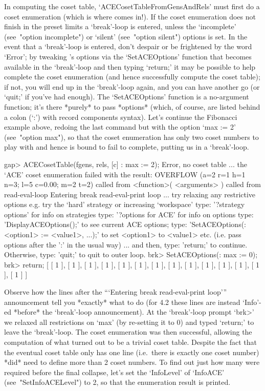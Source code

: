In computing  the  coset  table,  `ACECosetTableFromGensAndRels'  must
first do a coset enumeration (which is where {\ACE} comes in!). If the
coset enumeration does not finish in the preset limits a  `break'-loop
is entered,  unless  the  `incomplete'  (see~"option  incomplete")  or
`silent' (see~"option silent") options is set. In  the  event  that  a
`break'-loop is entered, don't despair or be frightened  by  the  word
`Error'; by tweaking {\ACE}'s options via the `SetACEOptions' function
that becomes available in the `break'-loop and then  typing  `return;'
it may be possible to help {\ACE} complete the coset enumeration  (and
hence successfully compute the coset table); if not, you will  end  up
in the `break'-loop again, and you can have another go (or `quit;'  if
you've had enough). The  `SetACEOptions'  function  is  a  no-argument
function; it's there *purely* to pass *options* (which, of course, are
listed behind a colon (`:')  with  record  components  syntax).  Let's
continue the Fibonacci example above, redoing  the  last  command  but
with the option `max := 2'  (see~"option  max"),  so  that  the  coset
enumeration has only two coset numbers to play with and hence is bound
to fail to complete, putting us in a `break'-loop.

\beginexample
gap> ACECosetTable(fgens, rels, [c] : max := 2);
Error, no coset table ...
 the `ACE' coset enumeration failed with the result:
 OVERFLOW (a=2 r=1 h=1 n=3; l=5 c=0.00; m=2 t=2)
 called from
<function>( <arguments> ) called from read-eval-loop
Entering break read-eval-print loop ...
 try relaxing any restrictive options
 e.g. try the `hard' strategy or increasing `workspace'
 type: '?strategy options' for info on strategies
 type: '?options for ACE' for info on options
 type: 'DisplayACEOptions();' to see current ACE options;
 type: 'SetACEOptions(:<option1> := <value1>, ...);'
 to set <option1> to <value1> etc.
 (i.e. pass options after the ':' in the usual way)
 ... and then, type: 'return;' to continue.
 Otherwise, type: 'quit;' to quit to outer loop.
brk> SetACEOptions(: max := 0);
brk> return;
[ [ 1 ], [ 1 ], [ 1 ], [ 1 ], [ 1 ], [ 1 ], [ 1 ], [ 1 ], [ 1 ], [ 1 ], 
  [ 1 ], [ 1 ], [ 1 ], [ 1 ] ]
\endexample

Observe how the lines  after  the  ```Entering  break  read-eval-print
loop''' announcement tell you *exactly* what to  do  (for  {\GAP}  4.2
these  lines  are  instead   `Info'-ed   *before*   the   `break'-loop
announcement). At  the  `break'-loop  prompt  `brk>'  we  relaxed  all
restrictions on `max' (by re-setting it to 0) and typed  `return;'  to
leave the `break'-loop. The coset  enumeration  was  then  successful,
allowing the computation of what turned out  to  be  a  trivial  coset
table. Despite the fact that the eventual coset  table  only  has  one
line (i.e.~there is exactly one coset number)  {\ACE}  *did*  need  to
define more than 2 coset numbers. To  find  out  just  how  many  were
required before the final  collapse,  let's  set  the  `InfoLevel'  of
`InfoACE' (see~"SetInfoACELevel") to 2, so that the {\ACE} enumeration
result is printed.

